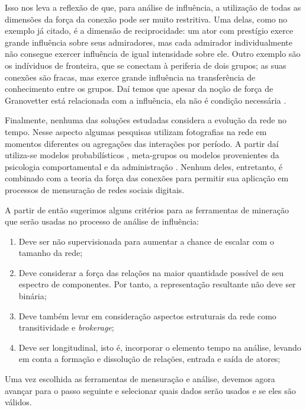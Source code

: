 Isso nos leva a reflexão de que, para análise de influência, a utilização de
todas as dimensões da força da conexão pode ser muito restritiva. Uma delas, como
no exemplo já citado, é a dimensão de reciprocidade: um ator com prestígio exerce
grande influência sobre seus admiradores, mas cada admirador individualmente não
consegue exercer influência de igual intensidade sobre ele. Outro exemplo são os
indíviduos de fronteira, que se conectam à periferia de dois grupos; as suas
conexões são fracas, mas exerce grande influência na transferência de
conhecimento entre os grupos. Daí temos que apesar da noção de força de
Granovetter está relacionada com a influência, ela não é condição necessária
\citep{Brown2007}.

Finalmente, nenhuma das soluções estudadas considera a evolução da rede no
tempo. Nesse aspecto algumas pesquisas utilizam fotografias na rede em
momentos diferentes ou agregações das interações por período. A partir daí
utiliza-se modelos probabilísticos \citep{Sarkar2005}, meta-grupos
\citep{Berger-Wolf2006} ou modelos provenientes da psicologia comportamental e da
administração \citep{Brelger2004}. Nenhum deles, entretanto, é combinado com
a teoria da força das conexões para permitir sua aplicação em processos de
mensuração de redes sociais digitais.

A partir de então sugerimos alguns critérios para as ferramentas de mineração
que serão usadas no processo de análise de influência:

\begin{enumerate}
  \item Deve ser não supervisionada para aumentar a chance de escalar com o
  tamanho da rede;
  \item Deve considerar a força das relações na maior quantidade possível de seu
  espectro de componentes. Por tanto, a representação resultante não deve ser
  binária;
  \item Deve também levar em consideração aspectos estruturais da rede como
  transitividade e \emph{brokerage};
  \item Deve ser longitudinal, isto é, incorporar o elemento tempo na análise,
 levando em conta a formação e dissolução de relações, entrada e saída de
 atores;
\end{enumerate}

Uma vez escolhida as ferramentas de mensuração e análise, devemos agora avançar
para o passo seguinte e selecionar quais dados serão usados e se eles são
válidos.

